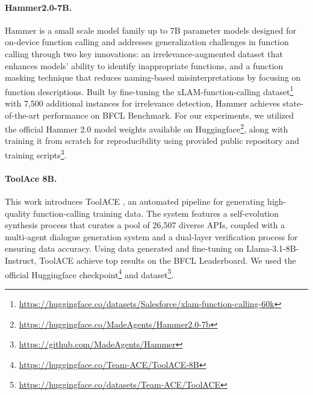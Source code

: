 \paragraph{Hammer2.0-7B.} Hammer \cite{Lin2024Hammer} is a small scale model family up to 7B parameter models designed for on-device function calling and addresses generalization challenges in function calling through two key innovations: an irrelevance-augmented dataset that enhances models' ability to identify inappropriate functions, and a function masking technique that reduces naming-based misinterpretations by focusing on function descriptions. Built by fine-tuning the xLAM-function-calling dataset\footnote{\url{https://huggingface.co/datasets/Salesforce/xlam-function-calling-60k}} with 7,500 additional instances for irrelevance detection, Hammer achieves state-of-the-art performance on BFCL Benchmark. For our experiments, we utilized the official Hammer 2.0 model weights available on Huggingface\footnote{\url{https://huggingface.co/MadeAgents/Hammer2.0-7b}}, along with training it from scratch for reproducibility using provided public repository and training scripts\footnote{\url{https://github.com/MadeAgents/Hammer}}.

\paragraph{ToolAce 8B.} This work introduces ToolACE \cite{Liu2024ToolACE}, an automated pipeline for generating high-quality function-calling training data. The system features a self-evolution synthesis process that curates a pool of 26,507 diverse APIs, coupled with a multi-agent dialogue generation system and a dual-layer verification process for ensuring data accuracy. Using data generated and fine-tuning on Llama-3.1-8B-Instruct, ToolACE achieve top results on the BFCL Leaderboard. We used the official Huggingface checkpoint\footnote{\url{https://huggingface.co/Team-ACE/ToolACE-8B}} and dataset\footnote{\url{https://huggingface.co/datasets/Team-ACE/ToolACE}}.

